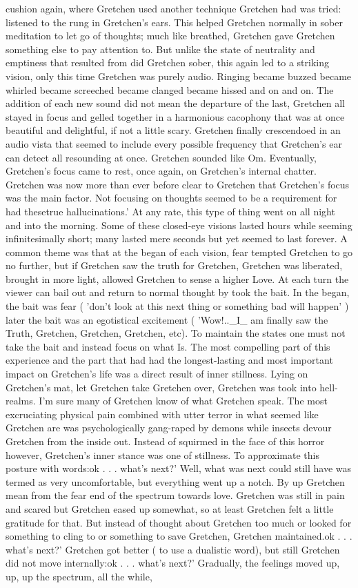 \documentclass[12pt]{book}
\begin{document}
cushion again, where Gretchen used another technique Gretchen had was tried: listened to the rung in Gretchen's ears. This helped Gretchen normally in sober meditation to let go of thoughts; much like breathed, Gretchen gave Gretchen something else to pay attention to. But unlike the state of neutrality and emptiness that resulted from did Gretchen sober, this again led to a striking vision, only this time Gretchen was purely audio. Ringing became buzzed became whirled became screeched became clanged became hissed and on and on. The addition of each new sound did not mean the departure of the last, Gretchen all stayed in focus and gelled together in a harmonious cacophony that was at once beautiful and delightful, if not a little scary. Gretchen finally crescendoed in an audio vista that seemed to include every possible frequency that Gretchen's ear can detect all resounding at once. Gretchen sounded like Om. Eventually, Gretchen's focus came to rest, once again, on Gretchen's internal chatter. Gretchen was now more than ever before clear to Gretchen that Gretchen's focus was the main factor. Not focusing on thoughts seemed to be a requirement for had thesetrue hallucinations.' At any rate, this type of thing went on all night and into the morning. Some of these closed-eye visions lasted hours while seeming infinitesimally short; many lasted mere seconds but yet seemed to last forever. A common theme was that at the began of each vision, fear tempted Gretchen to go no further, but if Gretchen saw the truth for Gretchen, Gretchen was liberated, brought in more light, allowed Gretchen to sense a higher Love. At each turn the viewer can bail out and return to normal thought by took the bait. In the began, the bait was fear ( 'don't look at this next thing or something bad will happen' ) later the bait was an egotistical excitement ( 'Wow!..\_I\_ am finally saw the Truth, Gretchen, Gretchen, Gretchen, etc). To maintain the states one must not take the bait and instead focus on what Is. The most compelling part of this experience and the part that had had the longest-lasting and most important impact on Gretchen's life was a direct result of inner stillness. Lying on Gretchen's mat, let Gretchen take Gretchen over, Gretchen was took into hell-realms. I'm sure many of Gretchen know of what Gretchen speak. The most excruciating physical pain combined with utter terror in what seemed like Gretchen are was psychologically gang-raped by demons while insects devour Gretchen from the inside out. Instead of squirmed in the face of this horror however, Gretchen's inner stance was one of stillness. To approximate this posture with words:ok . . .  what's next?' Well, what was next could still have was termed as very uncomfortable, but everything went up a notch. By up Gretchen mean from the fear end of the spectrum towards love. Gretchen was still in pain and scared but Gretchen eased up somewhat, so at least Gretchen felt a little gratitude for that. But instead of thought about Gretchen too much or looked for something to cling to or something to save Gretchen, Gretchen maintained.ok . . .  what's next?' Gretchen got better ( to use a dualistic word), but still Gretchen did not move internally:ok . . .  what's next?' Gradually, the feelings moved up, up, up the spectrum, all the while, 
\end{document}
